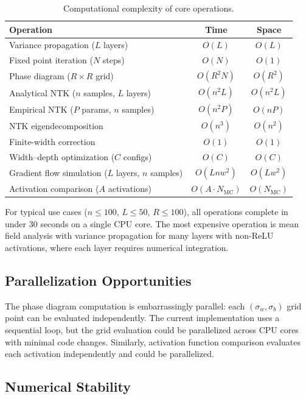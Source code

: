 \documentclass[10pt]{article}
\theoremstyle{definition}
\begin{document}
\begin{table}[htbp]
\centering
\caption{Computational complexity of core operations.}
\label{tab:complexity}
\begin{tabular}{lcc}
\toprule
Operation & Time & Space \\
\midrule
Variance propagation ($L$ layers) & $O(L)$ & $O(L)$ \\
Fixed point iteration ($N$ steps) & $O(N)$ & $O(1)$ \\
Phase diagram ($R \times R$ grid) & $O(R^2 N)$ & $O(R^2)$ \\
Analytical NTK ($n$ samples, $L$ layers) & $O(n^2 L)$ & $O(n^2 L)$ \\
Empirical NTK ($P$ params, $n$ samples) & $O(n^2 P)$ & $O(nP)$ \\
NTK eigendecomposition & $O(n^3)$ & $O(n^2)$ \\
Finite-width correction & $O(1)$ & $O(1)$ \\
Width--depth optimization ($C$ configs) & $O(C)$ & $O(C)$ \\
Gradient flow simulation ($L$ layers, $n$ samples) & $O(Lnw^2)$ & $O(Lw^2)$ \\
Activation comparison ($A$ activations) & $O(A \cdot N_{\text{MC}})$ & $O(N_{\text{MC}})$ \\
\bottomrule
\end{tabular}
\end{table}

For typical use cases ($n \leq 100$, $L \leq 50$, $R \leq 100$), all operations complete in under 30 seconds on a single CPU core.
The most expensive operation is mean field analysis with variance propagation for many layers with non-ReLU activations, where each layer requires numerical integration.

\subsection{Parallelization Opportunities}

The phase diagram computation is embarrassingly parallel: each $(\sigma_w, \sigma_b)$ grid point can be evaluated independently.
The current implementation uses a sequential loop, but the grid evaluation could be parallelized across CPU cores with minimal code changes.
Similarly, activation function comparison evaluates each activation independently and could be parallelized.

\subsection{Numerical Stability}
\end{document}
